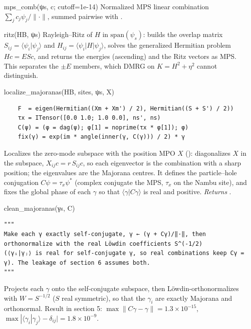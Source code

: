 \begin{function}{mps\_comb(ψs, c; cutoff=1e-14)}
Normalized MPS linear combination $\sum_j c_j\psi_j/\|\cdot\|$, summed pairwise with .
\end{function}

\begin{function}{ritz(HB, ψs)}
Rayleigh--Ritz of $H$ in $\mathrm{span}(\psi_s)$: builds the overlap matrix $S_{ij} = \langle\psi_i|\psi_j\rangle$ and
$H_{ij} = \langle\psi_i|H|\psi_j\rangle$, solves the generalized Hermitian problem $Hc = ESc$, and returns the energies (ascending) and the
Ritz vectors as MPS. This separates the $\pm E$ members, which DMRG on $K = H^2+\eta^2$ cannot distinguish.
\end{function}

\begin{function}{localize\_majoranas(HB, sites, ψs, X)}
\begin{Verbatim}
    F  = eigen(Hermitian((Xm + Xm') / 2), Hermitian((S + S') / 2))
    τx = ITensor([0.0 1.0; 1.0 0.0], ns', ns)
    C(ψ) = (φ = dag(ψ); φ[1] = noprime(τx * φ[1]); φ)
    fix(γ) = exp(im * angle(inner(γ, C(γ))) / 2) * γ
\end{Verbatim}
Localizes the zero-mode subspace with the position MPO $X$ (): diagonalizes $X$ in the subspace,
$X_{ij}c = r\,S_{ij}c$, so each eigenvector is the combination with a sharp position; the eigenvalues are the Majorana centres. It defines
the particle--hole conjugation $C\psi = \tau_x\psi^*$ (complex conjugate the MPS, $\tau_x$ on the Nambu site), and fixes the global phase of
each $\gamma$ so that $\langle\gamma|C\gamma\rangle$ is real and positive. \emph{Returns} .
\end{function}

\begin{function}{clean\_majoranas(γs, C)}
\begin{Verbatim}
"""
Make each γ exactly self-conjugate, γ ← (γ + Cγ)/‖·‖, then orthonormalize with the real Löwdin coefficients S^(-1/2)
(⟨γᵢ|γⱼ⟩ is real for self-conjugate γ, so real combinations keep Cγ = γ). The leakage of section 6 assumes both.
"""
\end{Verbatim}
Projects each $\gamma$ onto the self-conjugate subspace, then Löwdin-orthonormalizes with $W = S^{-1/2}$ ($S$ real symmetric), so that the
$\gamma_i$ are exactly Majorana and orthonormal. Result in section 5: $\max\|C\gamma-\gamma\| = 1.3\times10^{-15}$,
$\max|\langle\gamma_i|\gamma_j\rangle - \delta_{ij}| = 1.8\times10^{-9}$.
\end{function}

